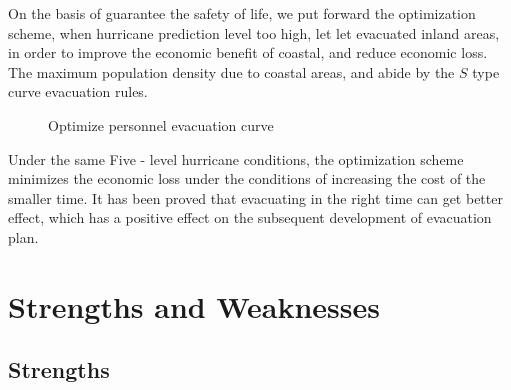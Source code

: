 \documentclass{mcmthesis}
\begin{document}
On the basis of guarantee the safety of life, we put forward the optimization scheme, when hurricane prediction level too high, let let evacuated inland areas, in order to improve the economic benefit of coastal, and reduce economic loss. The maximum population density due to coastal areas, and abide by the $S$ type curve evacuation rules.

\begin{figure}[!htbp]
  \caption{Optimize personnel evacuation curve}\label{figure5}
\end{figure}

Under the same Five - level hurricane conditions, the optimization scheme minimizes the economic loss under the conditions of increasing the cost of the smaller time. It has been proved that evacuating in the right time can get better effect, which has a positive effect on the subsequent development of evacuation plan.

\section{Strengths and Weaknesses}

\subsection{Strengths}
\end{document}
